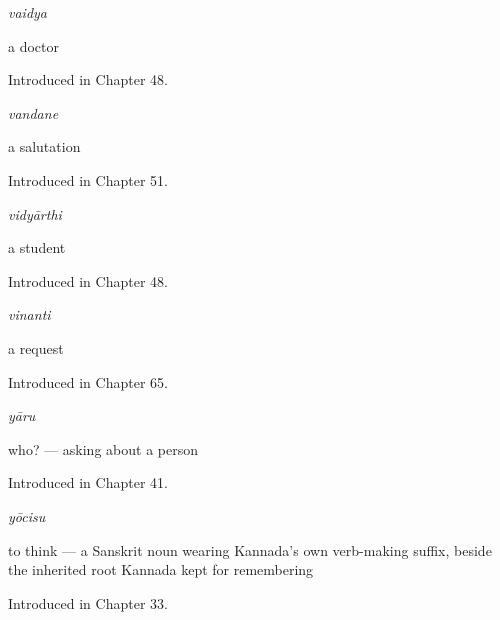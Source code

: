 \noindent\begin{minipage}[t]{\linewidth}
\raggedright
\textbf{}\enspace\emph{vaidya}\par
\small a doctor\par
\footnotesize Introduced in Chapter 48.
\end{minipage}\par\medskip

\noindent\begin{minipage}[t]{\linewidth}
\raggedright
\textbf{}\enspace\emph{vandane}\par
\small a salutation\par
\footnotesize Introduced in Chapter 51.
\end{minipage}\par\medskip

\noindent\begin{minipage}[t]{\linewidth}
\raggedright
\textbf{}\enspace\emph{vidyārthi}\par
\small a student\par
\footnotesize Introduced in Chapter 48.
\end{minipage}\par\medskip

\noindent\begin{minipage}[t]{\linewidth}
\raggedright
\textbf{}\enspace\emph{vinanti}\par
\small a request\par
\footnotesize Introduced in Chapter 65.
\end{minipage}\par\medskip

\noindent\begin{minipage}[t]{\linewidth}
\raggedright
\textbf{}\enspace\emph{yāru}\par
\small who? — asking about a person\par
\footnotesize Introduced in Chapter 41.
\end{minipage}\par\medskip

\noindent\begin{minipage}[t]{\linewidth}
\raggedright
\textbf{}\enspace\emph{yōcisu}\par
\small to think — a Sanskrit noun wearing Kannada's own verb-making suffix, beside the inherited root Kannada kept for remembering\par
\footnotesize Introduced in Chapter 33.
\end{minipage}\par\medskip

